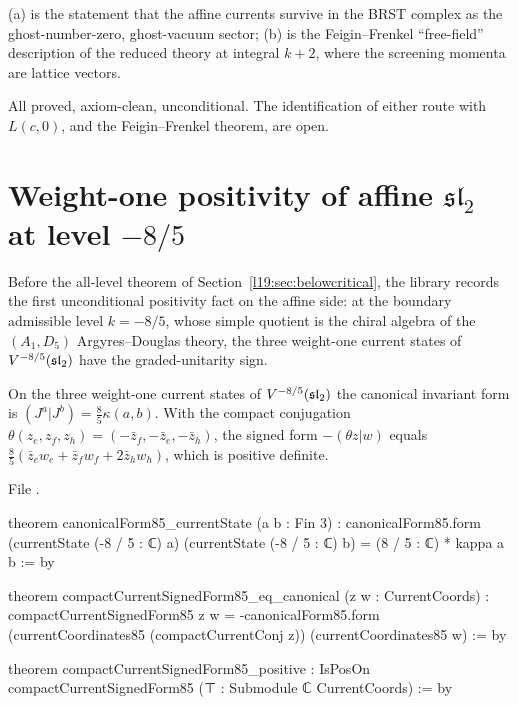\begin{physics}
(a) is the statement that the affine currents survive in the BRST complex as the ghost-number-zero,
ghost-vacuum sector; (b) is the Feigin--Frenkel ``free-field'' description of the reduced theory at integral
$k+2$, where the screening momenta are lattice vectors.
\end{physics}

\begin{status}
All proved, axiom-clean, unconditional. The identification of either route with $L(c,0)$, and the Feigin--Frenkel
theorem, are open.
\end{status}

\section{Weight-one positivity of affine \texorpdfstring{$\mathfrak{sl}_2$}{sl(2)} at level \texorpdfstring{$-8/5$}{-8/5}}\label{l19:sec:aff85}

Before the all-level theorem of Section~\ref{l19:sec:belowcritical}, the library records the first unconditional
positivity fact on the affine side: at the boundary admissible level $k=-8/5$, whose simple quotient is the chiral
algebra of the $(A_1,D_5)$ Argyres--Douglas theory, the three weight-one current states of $V^{-8/5}(\mathfrak{sl}_2)$ have
the graded-unitarity sign.


\begin{theorem}[Weight-one Hermitian positivity at $k=-8/5$]\label{l19:thm:aff85}
On the three weight-one current states of $V^{-8/5}(\mathfrak{sl}_2)$ the canonical invariant form is
$(J^a|J^b) = \tfrac85\kappa(a,b)$. With the compact conjugation $\theta(z_e,z_f,z_h) =
(-\bar z_f,-\bar z_e,-\bar z_h)$, the signed form $-(\theta z|w)$ equals
$\tfrac85(\bar z_ew_e+\bar z_fw_f+2\bar z_hw_h)$, which is positive definite.
\end{theorem}

\noindent File .
\begin{leancode}
theorem canonicalForm85_currentState (a b : Fin 3) :
    canonicalForm85.form (currentState (-8 / 5 : ℂ) a)
      (currentState (-8 / 5 : ℂ) b) = (8 / 5 : ℂ) * kappa a b := by

theorem compactCurrentSignedForm85_eq_canonical (z w : CurrentCoords) :
    compactCurrentSignedForm85 z w =
      -canonicalForm85.form (currentCoordinates85 (compactCurrentConj z))
        (currentCoordinates85 w) := by

theorem compactCurrentSignedForm85_positive :
    IsPosOn compactCurrentSignedForm85 (⊤ : Submodule ℂ CurrentCoords) := by
\end{leancode}

